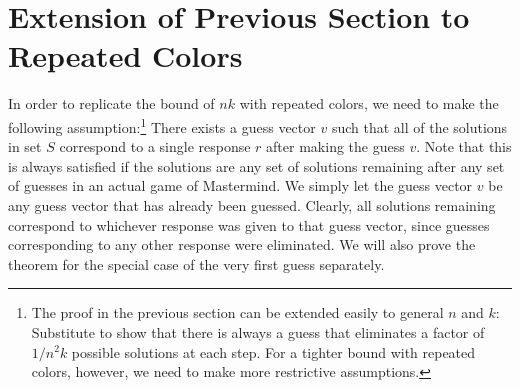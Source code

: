 \documentclass[12pt, a4paper]{article}
\begin{document}
\clearpage
\section*{Extension of Previous Section to Repeated Colors}
	In order to replicate the bound of $nk$ with repeated colors, we need to make the
	following assumption:\footnote{The proof in the previous section can be extended
	easily to general $n$ and $k$: Substitute to show that there is always a guess that
	eliminates a factor of $1/n^2k$ possible solutions at each step. For a tighter
	bound with repeated colors, however, we need to make more restrictive assumptions.}
	There exists a guess vector $v$ such that all of the solutions in set $S$
	correspond to a single response $r$ after making the guess $v$. Note that this
	is always satisfied if the solutions are any set of solutions remaining after
	any set of guesses in an actual game of Mastermind. We simply let the guess vector
	$v$ be any guess vector that has already been guessed. Clearly, all solutions
	remaining correspond to whichever response was given to that guess vector, since
	guesses corresponding to any other response were eliminated. We will also prove the
	theorem for the special case of the very first guess separately.
	
\end{document}
